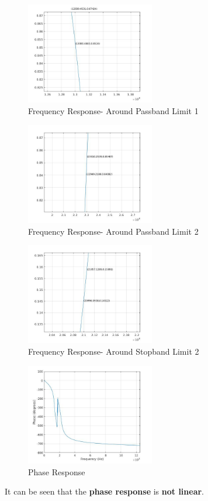\documentclass[12pt]{article}
\begin{document}
\begin{figure}[h!]
	\centering	
	\includegraphics[width = 0.5\textwidth]{2pb1.jpg}
    \caption{Frequency Response- Around Passband Limit 1}
\end{figure}
\clearpage
\begin{figure}[h!]
	\centering	
	\includegraphics[width = 0.5\textwidth]{2pb2.jpg}
    \caption{Frequency Response- Around Passband Limit 2}
\end{figure}
\begin{figure}[h!]
	\centering	
	\includegraphics[width = 0.5\textwidth]{2sb2.jpg}
    \caption{Frequency Response- Around Stopband Limit 2}
\end{figure}
\clearpage
\begin{figure}[h!]
	\centering	
	\includegraphics[width = 0.5\textwidth]{2ph.jpg}
    \caption{Phase Response}
\end{figure}
It can be seen that the \textbf{phase response} is \textbf{not linear}.
\end{document}
